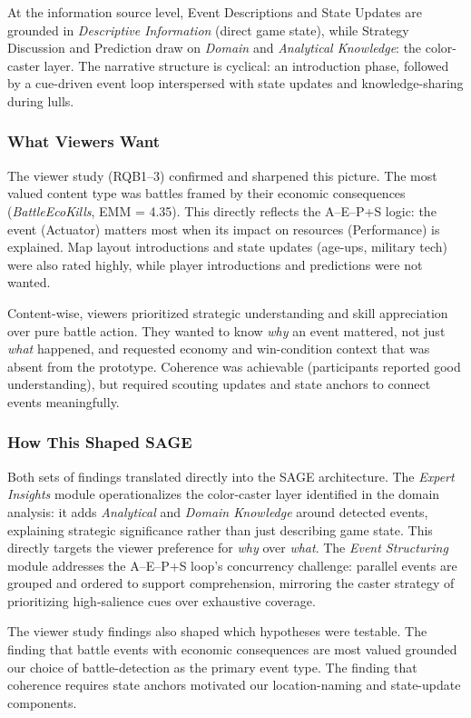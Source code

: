 At the information source level, Event Descriptions and State Updates are grounded in \textit{Descriptive Information} (direct game state), while Strategy Discussion and Prediction draw on \textit{Domain} and \textit{Analytical Knowledge}: the color-caster layer. The narrative structure is cyclical: an introduction phase, followed by a cue-driven event loop interspersed with state updates and knowledge-sharing during lulls.

\subsubsection{What Viewers Want}
The viewer study (RQB1--3) confirmed and sharpened this picture. The most valued content type was battles framed by their economic consequences (\textit{BattleEcoKills}, EMM = 4.35). This directly reflects the A--E--P+S logic: the event (Actuator) matters most when its impact on resources (Performance) is explained. Map layout introductions and state updates (age-ups, military tech) were also rated highly, while player introductions and predictions were not wanted.

Content-wise, viewers prioritized strategic understanding and skill appreciation over pure battle action. They wanted to know \textit{why} an event mattered, not just \textit{what} happened, and requested economy and win-condition context that was absent from the prototype. Coherence was achievable (participants reported good understanding), but required scouting updates and state anchors to connect events meaningfully.

\subsubsection{How This Shaped SAGE}
Both sets of findings translated directly into the SAGE architecture. The \textit{Expert Insights} module operationalizes the color-caster layer identified in the domain analysis: it adds \textit{Analytical} and \textit{Domain Knowledge} around detected events, explaining strategic significance rather than just describing game state. This directly targets the viewer preference for \textit{why} over \textit{what}. The \textit{Event Structuring} module addresses the A--E--P+S loop's concurrency challenge: parallel events are grouped and ordered to support comprehension, mirroring the caster strategy of prioritizing high-salience cues over exhaustive coverage.

The viewer study findings also shaped which hypotheses were testable. The finding that battle events with economic consequences are most valued grounded our choice of battle-detection as the primary event type. The finding that coherence requires state anchors motivated our location-naming and state-update components.

